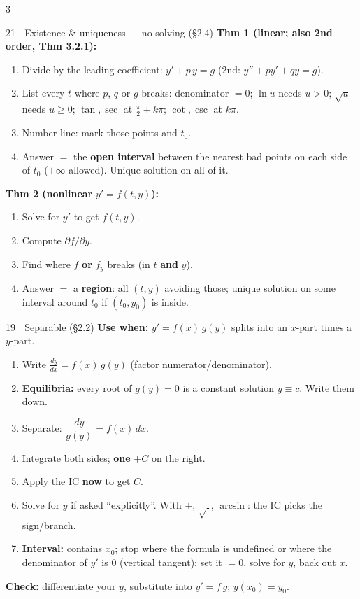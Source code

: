 \documentclass[8pt]{extarticle}
\newcommand{\key}[1]{\textcolor{grn}{\textbf{#1}}}
\newcommand{\when}[1]{\textcolor{amb}{\textbf{Use when:}} #1\par}
\newcommand{\chk}[1]{\par\textcolor{grn}{\textbf{Check:}} #1}
\begin{document}
\begin{multicols*}{3}
\begin{card}{21 \;|\; Existence \& uniqueness --- no solving (\S2.4)}
\key{Thm 1 (linear; also 2nd order, Thm 3.2.1):}
\begin{enumerate}
\item Divide by the leading coefficient: $y'+p\,y=g$ \;(2nd: $y''+py'+qy=g$).
\item List every $t$ where $p$, $q$ or $g$ breaks: denominator $=0$; $\ln u$ needs $u>0$; $\sqrt u$ needs $u\ge0$; $\tan,\sec$ at $\frac\pi2+k\pi$; $\cot,\csc$ at $k\pi$.
\item Number line: mark those points and $t_0$.
\item Answer $=$ the \textbf{open interval} between the nearest bad points on each side of $t_0$ ($\pm\infty$ allowed). Unique solution on all of it.
\end{enumerate}
\key{Thm 2 (nonlinear} $y'=f(t,y)$\key{):}
\begin{enumerate}
\item Solve for $y'$ to get $f(t,y)$. \;\item Compute $\partial f/\partial y$.
\item Find where $f$ \textbf{or} $f_y$ breaks (in $t$ \textbf{and} $y$).
\item Answer $=$ a \textbf{region}: all $(t,y)$ avoiding those; unique solution on some interval around $t_0$ if $(t_0,y_0)$ is inside.
\end{enumerate}
\end{card}

\begin{card}{19 \;|\; Separable (\S2.2)}
\when{$y'=f(x)\,g(y)$ splits into an $x$-part times a $y$-part.}
\begin{enumerate}
\item Write $\frac{dy}{dx}=f(x)\,g(y)$ (factor numerator/denominator).
\item \key{Equilibria:} every root of $g(y)=0$ is a constant solution $y\equiv c$. Write them down.
\item Separate: $\dfrac{dy}{g(y)}=f(x)\,dx$.
\item Integrate both sides; \textbf{one} $+C$ on the right.
\item Apply the IC \textbf{now} to get $C$.
\item Solve for $y$ if asked ``explicitly''. With $\pm$, $\sqrt{\ }$, $\arcsin$: the IC picks the sign/branch.
\item \key{Interval:} contains $x_0$; stop where the formula is undefined or where the denominator of $y'$ is $0$ (vertical tangent): set it $=0$, solve for $y$, back out $x$.
\end{enumerate}
\chk{differentiate your $y$, substitute into $y'=f\,g$; $y(x_0)=y_0$.}
\end{card}


\end{multicols*}
\end{document}
